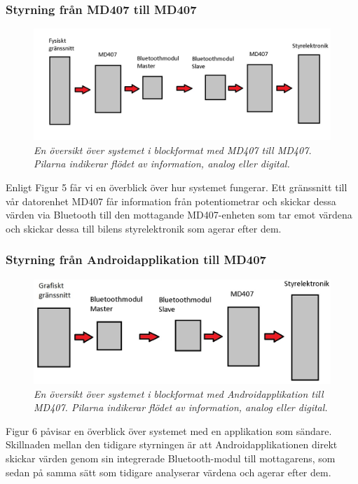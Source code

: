 \documentclass[a4paper]{article}
\begin{document}
\subsubsection{Styrning från MD407 till MD407}
\begin{figure}[H]
\includegraphics[width=\textwidth]{systemoversikt.jpg}
\centering
\caption{\it En översikt över systemet i blockformat med MD407 till MD407. Pilarna indikerar flödet av information, analog eller digital.}
\end{figure} 


Enligt Figur 5 får vi en överblick över hur systemet fungerar. Ett gränssnitt till vår datorenhet MD407 får information från potentiometrar och skickar dessa värden via Bluetooth till den mottagande MD407-enheten som tar emot värdena och skickar dessa till bilens styrelektronik som agerar efter dem.

\subsubsection{Styrning från Androidapplikation till MD407}
\begin{figure}[H]
\includegraphics[width=\textwidth]{systemoversiktAndroid.jpg}
\centering
\caption{\it En översikt över systemet i blockformat med Androidapplikation till MD407. Pilarna indikerar flödet av information, analog eller digital.}
\end{figure} 

Figur 6 påvisar en överblick över systemet med en applikation som sändare. Skillnaden mellan den tidigare styrningen är att Androidapplikationen direkt skickar värden genom sin integrerade Bluetooth-modul till mottagarens, som sedan på samma sätt som tidigare analyserar värdena och agerar efter dem.
\end{document}
